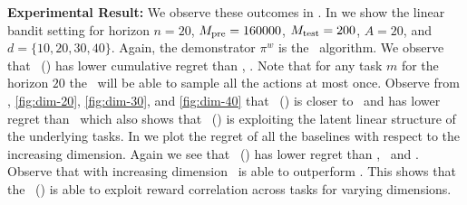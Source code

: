 \documentclass[10pt]{article}
\theoremstyle{plain}
\theoremstyle{definition}
\theoremstyle{remark}
\begin{document}
\textbf{Experimental Result:} We observe these outcomes in . In  we show the linear bandit setting for horizon $n=20$, $M_{\text{pre}} =  160000$, $M_{\text{test}} = 200$, $A=20$, and $d=\{10, 20, 30, 40\}$.
Again, the demonstrator $\pi^w$ is the \ts\ algorithm. We observe that \pred\ (\gt) has lower cumulative regret than \dptg, \ad. Note that for any task $m$ for the horizon $20$ the \ts\ will be able to sample all the actions at most once.
Observe from , \ref{fig:dim-20}, \ref{fig:dim-30}, and \ref{fig:dim-40} that \pred\ (\gt) is closer to \linucb\ and has lower regret than \ts\ which also shows that \pred\ (\gt) is exploiting the latent linear structure of the underlying tasks.
In  we plot the regret of all the baselines with respect to the increasing dimension. Again we see that \pred\ (\gt) has lower regret than \dptg, \ad\ and \ts. Observe that with  increasing dimension \pred\ is able to outperform \linucb. This shows that the \pred\ (\gt) is able to exploit reward correlation across tasks for varying dimensions.
\end{document}
